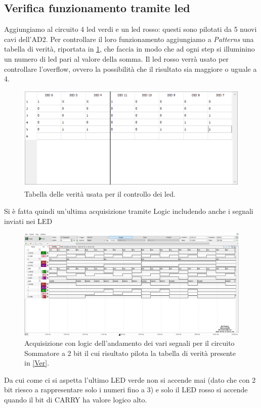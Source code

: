\documentclass[10pt, a4paper, italian]{article}
\begin{document}
\subsection{Verifica funzionamento tramite led}

Aggiungiamo al circuito 4 led verdi e un led rosso: questi sono pilotati da 5 nuovi cavi dell'AD2. Per controllare il loro funzionamento aggiungiamo a \emph{Patterns} una tabella di verità, riportata in \cref{fig: Ver}, che faccia in modo che ad ogni step si illuminino un numero di led pari al valore della somma. Il led rosso verrà usato per controllare l'overflow, ovvero la possibilità che il risultato sia maggiore o uguale a 4.

\begin{figure}[htbp]
    \centering
    \includegraphics[width=0.8\linewidth]{TAB_LED}
    \caption{Tabella delle verità usata per il controllo dei led.}
    \label{fig: Ver}
\end{figure}

Si è fatta quindi un'ultima acquisizione tramite Logic includendo anche i segnali inviati nei LED


\begin{figure}[htbp]
    \centering
    \includegraphics[width=0.8\linewidth]{sum_time_ROM}
    \caption{Acquisizione con logic dell'andamento dei vari segnali per il circuito Sommatore a 2 bit il cui risultato pilota la tabella di verità presente in \cref{Ver}.}
    \label{fig: ROM_sommatore} %
\end{figure}
Da cui come ci si aspetta l'ultimo LED verde non si accende mai (dato che con 2 bit riesco a rappresentare solo i numeri fino a 3) e solo il LED rosso si accende quando il bit di CARRY ha valore logico alto.
\end{document}
